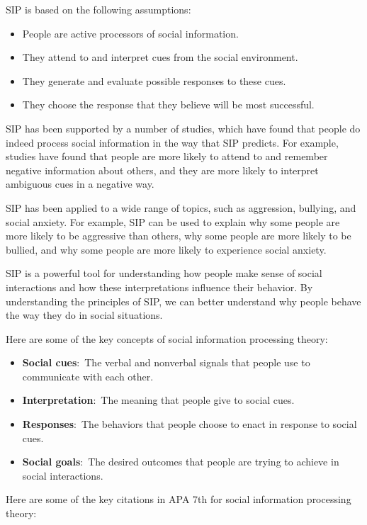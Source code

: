 \documentclass[
  b5paper]{book}
\begin{document}
SIP is based on the following assumptions:

\begin{itemize}
\item
  People are active processors of social information.
\item
  They attend to and interpret cues from the social environment.
\item
  They generate and evaluate possible responses to these cues.
\item
  They choose the response that they believe will be most successful.
\end{itemize}

SIP has been supported by a number of studies, which have found that people do indeed process social information in the way that SIP predicts. For example, studies have found that people are more likely to attend to and remember negative information about others, and they are more likely to interpret ambiguous cues in a negative way.

SIP has been applied to a wide range of topics, such as aggression, bullying, and social anxiety. For example, SIP can be used to explain why some people are more likely to be aggressive than others, why some people are more likely to be bullied, and why some people are more likely to experience social anxiety.

SIP is a powerful tool for understanding how people make sense of social interactions and how these interpretations influence their behavior. By understanding the principles of SIP, we can better understand why people behave the way they do in social situations.

Here are some of the key concepts of social information processing theory:

\begin{itemize}
\item
  \textbf{Social cues}:~The verbal and nonverbal signals that people use to communicate with each other.
\item
  \textbf{Interpretation}:~The meaning that people give to social cues.
\item
  \textbf{Responses}:~The behaviors that people choose to enact in response to social cues.
\item
  \textbf{Social goals}:~The desired outcomes that people are trying to achieve in social interactions.
\end{itemize}

Here are some of the key citations in APA 7th for social information processing theory:
\end{document}
